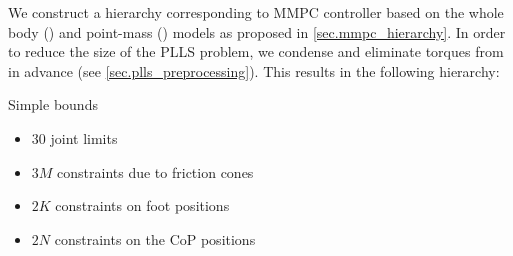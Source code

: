 We construct a hierarchy corresponding to \ac{MMPC} controller based on the
whole body () and point-mass () models as
proposed in \cref{sec.mmpc_hierarchy}. In order to reduce the size of the
\ac{PLLS} problem, we condense  and eliminate torques from
 in advance (see \cref{sec.plls_preprocessing}). This results
in the following hierarchy:
%
\begin{hierarchy}
    \level Simple bounds
            \begin{itemize}%
                \item \makebox[5.2cm][l]{
                        $\displaystyle \ubar{\ddq}^{\prime}  \le  \ddqn  \le  \bar{\ddq}^{\prime}$
                    }
                    $30$ joint limits
                \item {}
                    $3 M$ constraints due to friction cones
                \item {}
                    $2 K$ constraints on foot positions
                \item {}
                    $2 N$ constraints on the \acs{CoP} positions
            \end{itemize}


\end{hierarchy}
